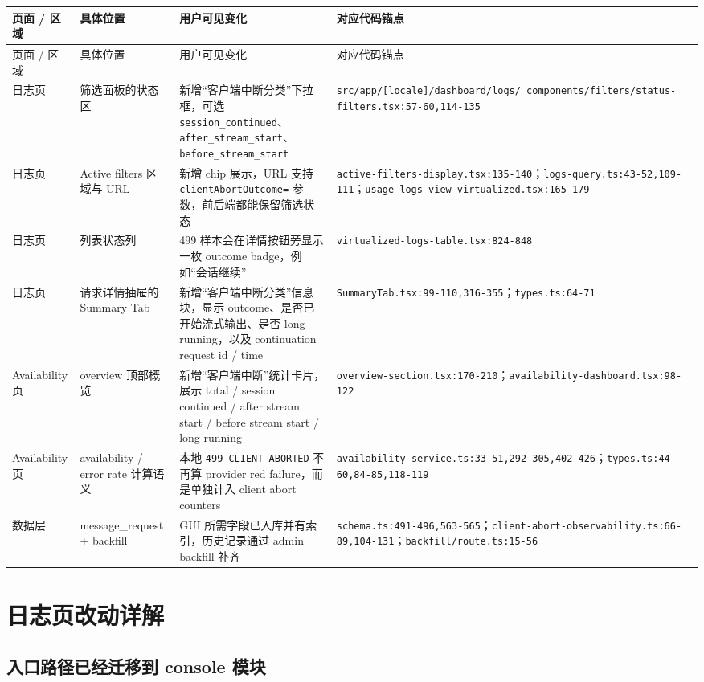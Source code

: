 \documentclass[a4paper]{article}
\newcommand{\filepath}[1]{\nolinkurl{#1}}
\begin{document}
\begin{longtable}{p{2.2cm}p{3.2cm}p{4.6cm}p{4.4cm}}
\toprule
页面 / 区域 & 具体位置 & 用户可见变化 & 对应代码锚点 \\
\midrule
\endfirsthead
\toprule
页面 / 区域 & 具体位置 & 用户可见变化 & 对应代码锚点 \\
\midrule
\endhead
日志页 & 筛选面板的状态区 & 新增“客户端中断分类”下拉框，可选 \texttt{session\_continued}、\texttt{after\_stream\_start}、\texttt{before\_stream\_start} & \filepath{src/app/[locale]/dashboard/logs/_components/filters/status-filters.tsx:57-60,114-135} \\
日志页 & Active filters 区域与 URL & 新增 chip 展示，URL 支持 \filepath{clientAbortOutcome=} 参数，前后端都能保留筛选状态 & \filepath{active-filters-display.tsx:135-140}；\filepath{logs-query.ts:43-52,109-111}；\filepath{usage-logs-view-virtualized.tsx:165-179} \\
日志页 & 列表状态列 & 499 样本会在详情按钮旁显示一枚 outcome badge，例如“会话继续” & \filepath{virtualized-logs-table.tsx:824-848} \\
日志页 & 请求详情抽屉的 Summary Tab & 新增“客户端中断分类”信息块，显示 outcome、是否已开始流式输出、是否 long-running，以及 continuation request id / time & \filepath{SummaryTab.tsx:99-110,316-355}；\filepath{types.ts:64-71} \\
Availability 页 & overview 顶部概览 & 新增“客户端中断”统计卡片，展示 total / session continued / after stream start / before stream start / long-running & \filepath{overview-section.tsx:170-210}；\filepath{availability-dashboard.tsx:98-122} \\
Availability 页 & availability / error rate 计算语义 & 本地 \texttt{499 CLIENT\_ABORTED} 不再算 provider red failure，而是单独计入 client abort counters & \filepath{availability-service.ts:33-51,292-305,402-426}；\filepath{types.ts:44-60,84-85,118-119} \\
数据层 & message\_request + backfill & GUI 所需字段已入库并有索引，历史记录通过 admin backfill 补齐 & \filepath{schema.ts:491-496,563-565}；\filepath{client-abort-observability.ts:66-89,104-131}；\filepath{backfill/route.ts:15-56} \\
\bottomrule
\end{longtable}

\section{日志页改动详解}

\subsection{入口路径已经迁移到 console 模块}
\end{document}
